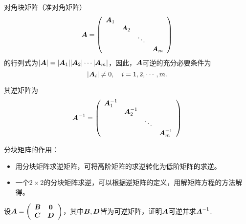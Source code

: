 \begin{dingyi}[可逆分块矩阵的逆矩阵]
  对角块矩阵（准对角矩阵）
  $$
  \boldsymbol{A} = \left(
    \begin{array}{cccc}
      \boldsymbol{A}_1&&&\\
          &\boldsymbol{A}_2&&\\
          &&\ddots&\\
          &&&\boldsymbol{A}_m
    \end{array}
  \right)
  $$
  的行列式为$|\boldsymbol{A}|=|\boldsymbol{A}_1||\boldsymbol{A}_2|\cdots|\boldsymbol{A}_m|$，因此，$\boldsymbol{A}$可逆的充分必要条件为
  $$
  |\boldsymbol{A}_i|\ne 0, \quad i=1,2,\cdots, m.
  $$

  其逆矩阵为
  $$
  \boldsymbol{A}^{-1} = \left(
    \begin{array}{cccc}
      \boldsymbol{A}_1^{-1}&&&\\
               &\boldsymbol{A}_2^{-1}&&\\
               &&\ddots&\\
               &&&\boldsymbol{A}_m^{-1}
    \end{array}
  \right)
  $$
\end{dingyi}



分块矩阵的作用：
\begin{itemize}
\item   用分块矩阵求逆矩阵，可将高阶矩阵的求逆转化为低阶矩阵的求逆。
\item   一个$2\times 2$的分块矩阵求逆，可以根据逆矩阵的定义，用解矩阵方程的方法解得。
\end{itemize}



\begin{li}
  设$\MA=\left(
    \begin{array}{cc}
      \MB&\M0\\
      \MC&\MD
    \end{array}
  \right)$，其中$\boldsymbol{B},\boldsymbol{D}$皆为可逆矩阵，证明$\boldsymbol{A}$可逆并求$\boldsymbol{A}^{-1}$.
\end{li}



